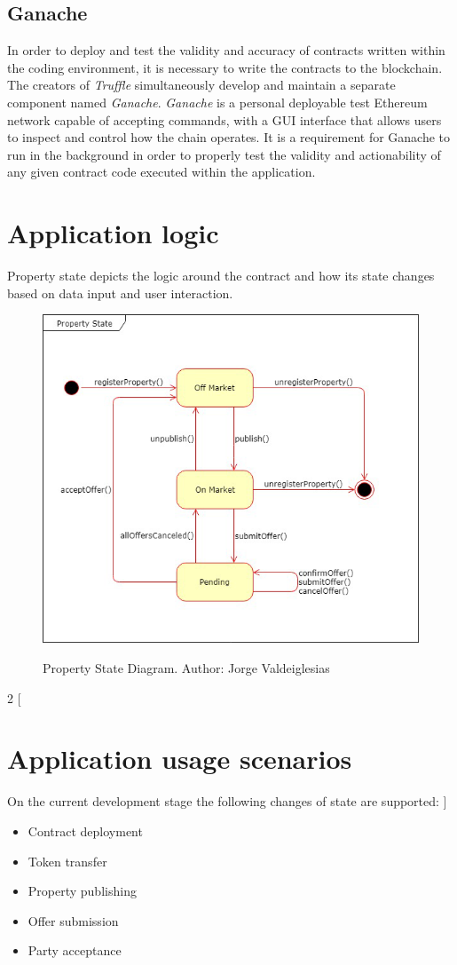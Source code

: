 \documentclass[submission,copyright,creativecommons]{eptcs}
\begin{document}
\subsection{Ganache}
In order to deploy and test the validity and accuracy of contracts written within the coding environment, it is necessary to write the contracts to the blockchain.  The creators of \textit{Truffle} simultaneously develop and maintain a separate component named \textit{Ganache}.  \textit{Ganache}\cite{Ganache} is a personal deployable test Ethereum network capable of accepting commands, with a GUI interface that allows users to inspect and control how the chain operates.  It is a requirement for Ganache to run in the background in order to properly test the validity and actionability of any given contract code executed within the application.

\section{Application logic}
Property state depicts the logic around the contract and how its state changes based on data input and user interaction.
\begin{figure}[h]
    \centering
    \includegraphics[width=5in]{property_state_uml.png}
    \label{fig:property_state_uml}
    \caption{Property State Diagram. Author: Jorge Valdeiglesias}
\end{figure}

\begin{multicols}{2}
[
\section{Application usage scenarios}
On the current development stage the following changes of state are supported:
]
\begin{itemize}
\item Contract deployment
\item Token transfer
\item Property publishing
\item Offer submission
\item Party acceptance
\end{itemize}
\end{multicols}
\end{document}
